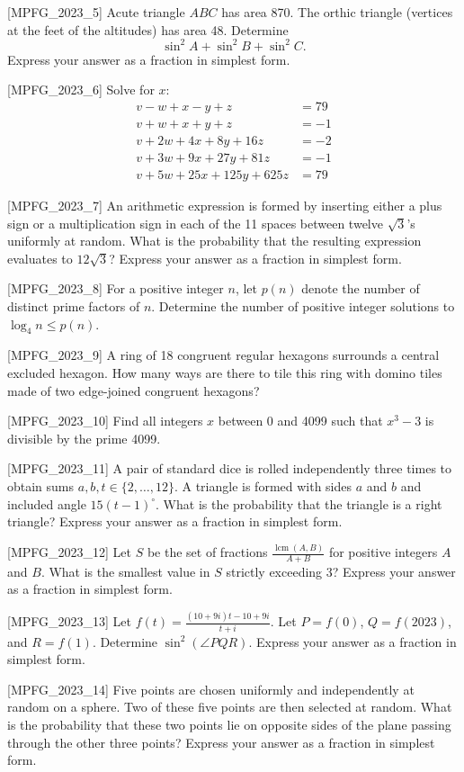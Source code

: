 [MPFG_2023_5]
Acute triangle $ABC$ has area 870. The orthic triangle (vertices at the feet of the altitudes) has area 48. Determine
$$\sin^2 A + \sin^2 B + \sin^2 C.$$
Express your answer as a fraction in simplest form.

[MPFG_2023_6]
Solve for $x$:
$$\begin{aligned}
v - w + x - y + z &= 79 \\
v + w + x + y + z &= -1 \\
v + 2w + 4x + 8y + 16z &= -2 \\
v + 3w + 9x + 27y + 81z &= -1 \\
v + 5w + 25x + 125y + 625z &= 79
\end{aligned}$$

[MPFG_2023_7]
An arithmetic expression is formed by inserting either a plus sign or a multiplication sign in each of the 11 spaces between twelve $\sqrt{3}$'s uniformly at random. What is the probability that the resulting expression evaluates to $12\sqrt{3}$? Express your answer as a fraction in simplest form.

[MPFG_2023_8]
For a positive integer $n$, let $p(n)$ denote the number of distinct prime factors of $n$. Determine the number of positive integer solutions to $\log_4 n \le p(n)$.

[MPFG_2023_9]
A ring of 18 congruent regular hexagons surrounds a central excluded hexagon. How many ways are there to tile this ring with domino tiles made of two edge-joined congruent hexagons?

[MPFG_2023_10]
Find all integers $x$ between 0 and 4099 such that $x^3 - 3$ is divisible by the prime 4099.

[MPFG_2023_11]
A pair of standard dice is rolled independently three times to obtain sums $a, b, t \in \{2, \dots, 12\}$. A triangle is formed with sides $a$ and $b$ and included angle $15(t-1)^\circ$. What is the probability that the triangle is a right triangle? Express your answer as a fraction in simplest form.

[MPFG_2023_12]
Let $S$ be the set of fractions $\frac{\operatorname{lcm}(A, B)}{A + B}$ for positive integers $A$ and $B$. What is the smallest value in $S$ strictly exceeding 3? Express your answer as a fraction in simplest form.

[MPFG_2023_13]
Let $f(t) = \frac{(10+9i)t - 10 + 9i}{t+i}$. Let $P = f(0)$, $Q = f(2023)$, and $R = f(1)$. Determine $\sin^2(\angle PQR)$. Express your answer as a fraction in simplest form.

[MPFG_2023_14]
Five points are chosen uniformly and independently at random on a sphere. Two of these five points are then selected at random. What is the probability that these two points lie on opposite sides of the plane passing through the other three points? Express your answer as a fraction in simplest form.

